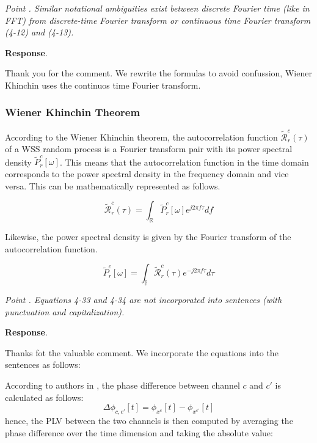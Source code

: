 \documentclass[runningheads]{llncs}
\newcommand{\Real}{\mathbb{R}}
\newenvironment{reviewer}{\setcounter{pointcounter}{1}}{}
\newcommand{\changes}[1]{\textcolor[rgb]{1.00,0.00,0.00}{#1}}
\newcommand{\point}[1]{\medskip \noindent
  \textsl{{\fontseries{b}\selectfont Point \thepointcounter}.
\stepcounter{pointcounter} #1}}
\newcommand{\reply}{\medskip \noindent \textbf{Response}.\ }
\begin{document}
\begin{reviewer}
  \point{Similar notational ambiguities exist between discrete
    Fourier time (like in FFT) from discrete-time Fourier transform or
  continuous time Fourier transform (4-12) and (4-13).}

  \reply{
    Thank you for the comment. We rewrite the formulas to avoid
    confussion, Wiener Khinchin uses the continuos time Fourier transform.

    \subsubsection{Wiener Khinchin Theorem}

    According to the Wiener Khinchin theorem, the autocorrelation
    function \changes{$\mathcal{\tilde{R}}^{c}_{r}(\tau)$} of a WSS
    random process is a Fourier transform pair with its power
    spectral density \changes{$\tilde{P}^{c}_{r}[\omega]$}. This
    means that the autocorrelation function in the time domain
    corresponds to the power spectral density in the frequency domain
    and vice versa. This can be mathematically represented as follows.

    \changes{
      \begin{equation}
        \mathcal{\tilde{R}}^{c}_{r}(\tau) = \int_{\Real}
        \tilde{P}^{c}_{r}[\omega] e^{j 2\pi f \tau} df
      \end{equation}
    }

    Likewise, the power spectral density is given by the Fourier
    transform of the autocorrelation function.

    \changes{
      \begin{equation}
        \tilde{P}^{c}_{r}[\omega] = \int_{\mathbb{f}}
        \mathcal{\tilde{R}}^{c}_{r}(\tau) e^{-j 2\pi f \tau} d\tau
      \end{equation}
    }
  }

  \point{Equations 4-33 and 4-34 are not incorporated into sentences
  (with punctuation and capitalization). }

  \reply{
    Thanks fot the valuable comment. We incorporate the equations
    into the sentences as follows:

    \changes{According to authors in \cite{cattai2021phase}, the
      phase difference between channel $c$ and $c'$ is calculated as follows:
    }
    \changes{
      \begin{equation}
        \Delta \phi_{c,c'}[t] = \phi_{x^{c}}[t] - \phi_{x^{c'}}[t]
      \end{equation}
    }
    \changes{
      hence, the PLV between the two channels is then computed by
      averaging the phase difference over the time dimension and taking
    the absolute value:}

}
\end{reviewer}
\end{document}
